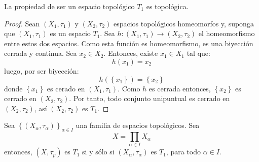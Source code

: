 \documentclass[12pt]{report}
\theoremstyle{largebreak}
\newcommand\cf[3]{\ensuremath{#1:#2\rightarrow#3}}
\begin{document}
    \begin{propo}
        La propiedad de ser un espacio topológico $T_1$ es topológica.
    \end{propo}

    \begin{proof}
        Sean $(X_1,\tau_1)$ y $(X_2,\tau_2)$ espacios topológicos homeomorfos y, suponga que $(X_1,\tau_1)$ es un espacio $T_1$. Sea $\cf{h}{(X_1,\tau_1)}{(X_2,\tau_2)}$ el homeomorfismo entre estos dos espacios. Como esta función es homeomorfismo, es una biyección cerrada y continua. Sea $x_2\in X_2$. Entonces, existe $x_1\in X_1$ tal que:
        \begin{equation*}
            h(x_1)=x_2
        \end{equation*}
        luego, por ser biyección:
        \begin{equation*}
            h(\left\{x_1\right\})=\left\{x_2\right\}
        \end{equation*}
        donde $\left\{x_1\right\}$ es cerado en $(X_1,\tau_1)$. Como $h$ es cerrada entonces, $\left\{x_2\right\}$ es cerrado en $(X_2,\tau_2)$. Por tanto, todo conjunto unipuntual es cerrado en $(X_2,\tau_2)$, así $(X_2,\tau_2)$ es $T_1$. 
    \end{proof}

    \begin{propo}
        Sea $\left\{(X_\alpha,\tau_\alpha)\right\}_{\alpha\in I}$ una familia de espacios topológicos. Sea
        \begin{equation*}
            X=\prod_{\alpha\in I}X_\alpha
        \end{equation*}
        entonces, $(X,\tau_p)$ es $T_1$ si y sólo si $(X_\alpha,\tau_\alpha)$ es $T_1$, para todo $\alpha\in I$.
    \end{propo}
\end{document}
